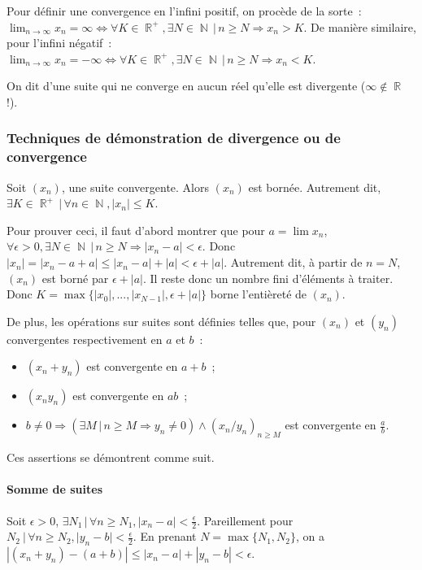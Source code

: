 \documentclass{article}
\DeclareMathOperator{\R}{\mathbb R}
\DeclareMathOperator{\N}{\mathbb N}
\theoremstyle{definition}
\theoremstyle{remark}
\begin{document}
		Pour définir une convergence en l'infini positif, on procède de la sorte~: $\lim_{n\to\infty} x_n = \infty \iff \forall K \in \R^+, \exists N \in \N \, | \, n \geq N \Rightarrow x_n > K$.
		De manière similaire, pour l'infini négatif~: $\lim_{n\to\infty}x_n = -\infty \iff \forall K \in \R^+, \exists N \in \N \, | \, n \geq N \Rightarrow x_n < K$.

		On dit d'une suite qui ne converge en aucun réel qu'elle est divergente ($\infty \not \in \R$ !).

		\subsubsection{Techniques de démonstration de divergence ou de convergence}
			Soit $(x_n)$, une suite convergente. Alors $(x_n)$ est bornée. Autrement dit, $\exists K \in \R^+ \, | \, \forall n \in \N, |x_n| \leq K$.

			Pour prouver ceci, il faut d'abord montrer que pour $a = \lim x_n$, $\forall \epsilon > 0, \exists N \in \N \, | \, n \geq N \Rightarrow |x_n - a| < \epsilon$.
			Donc $|x_n| = |x_n - a + a| \leq |x_n - a| + |a| < \epsilon + |a|$. Autrement dit, à partir de $n = N$, $(x_n)$ est borné par $\epsilon + |a|$.
			Il reste donc un nombre fini d'éléments à traiter. Donc $K = \max \{|x_0|, ..., |x_{N-1}|, \epsilon + |a|\}$ borne l'entièreté de $(x_n)$.

			De plus, les opérations sur suites sont définies telles que, pour $(x_n)$ et $(y_n)$ convergentes respectivement en $a$ et $b$~:

			\begin{itemize}
				\item $(x_n + y_n)$ est convergente en $a + b$~;
				\item $(x_ny_n)$ est convergente en $ab$~;
				\item $b \neq 0 \Rightarrow (\exists M \, | \, n \geq M \Rightarrow y_n \neq 0) \land (x_n/y_n)_{n \geq M}$ est convergente en $\frac ab$.
			\end{itemize}

			Ces assertions se démontrent comme suit.

			\paragraph{Somme de suites} Soit $\epsilon > 0$, $\exists N_1 \, | \, \forall n \geq N_1, |x_n - a| < \frac \epsilon2$. Pareillement pour
			$N_2 \ | \, \forall n \geq N_2, |y_n - b| < \frac \epsilon2$. En prenant $N = \max \{N_1, N_2\}$, on a $|(x_n + y_n) - (a + b)| \leq |x_n - a| + |y_n - b| < \epsilon$.
\end{document}
